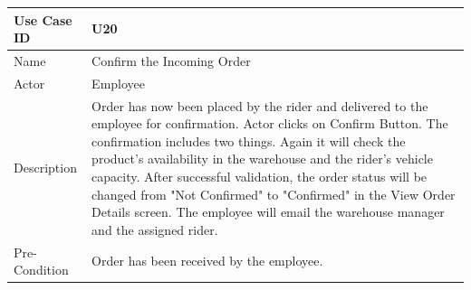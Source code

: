 \documentclass[12pt,a4paper]{report}
\begin{document}
\begin{tabular}{ | m{3cm} | m{12cm}| } \hline
Use Case ID &  U20 \\\hline

Name  	    &  Confirm the Incoming Order \\ \hline

Actor     	& Employee \\ \hline
Description  &  Order has now been placed by the rider and delivered to the employee for confirmation. Actor clicks on Confirm Button. The confirmation includes two things. Again it will check the product's availability in the warehouse and the rider's vehicle capacity. After successful validation, the order status will be changed from "Not Confirmed" to "Confirmed" in the View Order Details screen. The employee will email the warehouse manager and the assigned rider. \\ \hline

Pre-Condition & Order has been received by the employee.  \\ \hline
\end{tabular}
\end{document}
